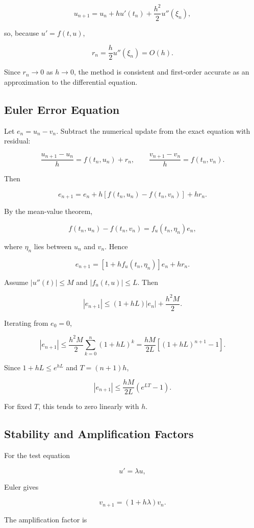 \documentclass[12pt, a4paper]{article}
\theoremstyle{break}
\begin{document}
\[
u_{n+1}=u_n+hu'(t_n)+\frac{h^2}{2}u''(\xi_n),
\]

so, because \(u'=f(t,u)\),

\[
r_n=\frac h2u''(\xi_n)=O(h).
\]

Since \(r_n\to0\) as \(h\to0\), the method is consistent and first-order accurate as an approximation to the differential equation.

\subsection{Euler Error Equation}\label{euler-error-equation}

Let \(e_n=u_n-v_n\). Subtract the numerical update from the exact equation with residual:

\[
\frac{u_{n+1}-u_n}{h}=f(t_n,u_n)+r_n,
\qquad
\frac{v_{n+1}-v_n}{h}=f(t_n,v_n).
\]

Then

\[
e_{n+1}=e_n+h[f(t_n,u_n)-f(t_n,v_n)]+hr_n.
\]

By the mean-value theorem,

\[
f(t_n,u_n)-f(t_n,v_n)=f_u(t_n,\eta_n)e_n,
\]

where \(\eta_n\) lies between \(u_n\) and \(v_n\). Hence

\[
e_{n+1}=[1+hf_u(t_n,\eta_n)]e_n+hr_n.
\]

Assume \(|u''(t)|\le M\) and \(|f_u(t,u)|\le L\). Then

\[
|e_{n+1}|\le(1+hL)|e_n|+\frac{h^2M}{2}.
\]

Iterating from \(e_0=0\),

\[
|e_{n+1}|\le\frac{h^2M}{2}\sum_{k=0}^n(1+hL)^k
=\frac{hM}{2L}[(1+hL)^{n+1}-1].
\]

Since \(1+hL\le e^{hL}\) and \(T=(n+1)h\),

\[
|e_{n+1}|\le\frac{hM}{2L}(e^{LT}-1).
\]

For fixed \(T\), this tends to zero linearly with \(h\).

\subsection{Stability and Amplification Factors}\label{stability-and-amplification-factors}

For the test equation

\[
u'=\lambda u,
\]

Euler gives

\[
v_{n+1}=(1+h\lambda)v_n.
\]

The amplification factor is
\end{document}
